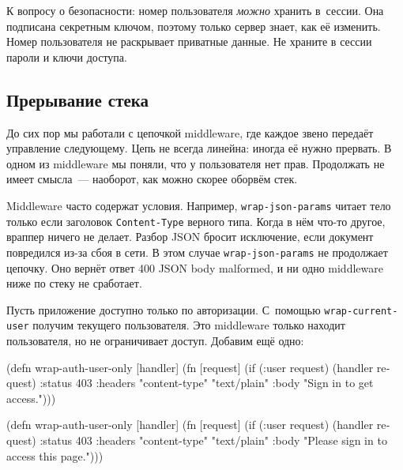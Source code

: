 К вопросу о безопасности: номер пользователя \emph{можно} хранить в~сессии. Она
подписана секретным ключом, поэтому только сервер знает, как её
изменить. Номер пользователя не раскрывает приватные данные. Не храните в сессии
пароли и ключи доступа.

\subsection{Прерывание стека}


До сих пор мы работали с цепочкой middleware, где каждое звено передаёт
управление следующему. Цепь не всегда линейна: иногда её нужно прервать. В
одном из middleware мы поняли, что у пользователя нет прав. Продолжать не имеет
смысла~--- наоборот, как можно скорее оборвём стек.


Middleware часто содержат условия. Например, \verb|wrap-json-params| читает тело
только если заголовок \verb|Content-Type| верного типа. Когда в нём что-то
другое, враппер ничего не делает. Разбор JSON бросит исключение, если документ
повредился из-за сбоя в сети. В этом случае \verb|wrap-json-params| не
продолжает цепочку. Оно вернёт ответ 400 JSON body malformed, и ни одно
middleware ниже по стеку не сработает.

Пусть приложение доступно только по авторизации. С~помощью
\verb|wrap-current-user| получим текущего пользователя. Это middleware только
находит пользователя, но не ограничивает доступ. Добавим ещё одно:


\ifx\DEVICETYPE\MOBILE

\begin{english}
  \begin{clojure}
(defn wrap-auth-user-only [handler]
  (fn [request]
    (if (:user request)
      (handler request)
      {:status 403
       :headers
       {"content-type" "text/plain"}
       :body "Sign in to get access."})))
  \end{clojure}
\end{english}

\else

\begin{english}
  \begin{clojure}
(defn wrap-auth-user-only [handler]
  (fn [request]
    (if (:user request)
      (handler request)
      {:status 403
       :headers {"content-type" "text/plain"}
       :body "Please sign in to access this page."})))
  \end{clojure}
\end{english}

